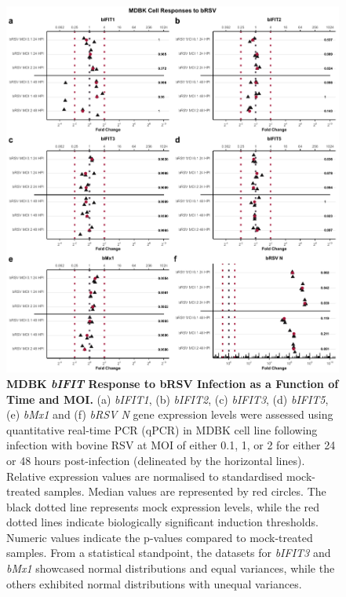 \begin{figure}
    \centering
    \includegraphics[width=1\linewidth]{07. Chapter 2/Figs/02. Induction/03. mdbk_brsv_timepoints.pdf}
    \caption[MDBK \textit{bIFIT} Response to bRSV Infection as a Function of Time and MOI.]{\textbf{MDBK \textit{bIFIT} Response to bRSV Infection as a Function of Time and MOI.} (a) \textit{bIFIT1}, (b) \textit{bIFIT2}, (c) \textit{bIFIT3}, (d) \textit{bIFIT5}, (e) \textit{bMx1} and (f) \textit{bRSV N} gene expression levels were assessed using quantitative real-time PCR (qPCR) in MDBK cell line following infection with bovine RSV at MOI of either 0.1, 1, or 2 for either 24 or 48 hours post-infection (delineated by the horizontal lines). Relative expression values are normalised to standardised mock-treated samples. Median values are represented by red circles. The black dotted line represents mock expression levels, while the red dotted lines indicate biologically significant induction thresholds. Numeric values indicate the p-values compared to mock-treated samples. From a statistical standpoint, the datasets for \textit{bIFIT3} and \textit{bMx1} showcased normal distributions and equal variances, while the others exhibited normal distributions with unequal variances.}
    \label{fig:MDBK responses to bRSV timepoints}
\end{figure}

